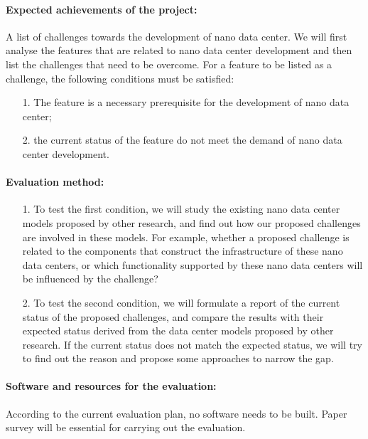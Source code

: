 \documentclass[sigchi-a, authorversion]{acmart}
\begin{document}
\paragraph{Expected achievements of the project:} A list of challenges towards the development of nano data center.
We will first analyse the features that are related to nano data center development and then list the challenges that need to be overcome. 
For a feature to be listed as a challenge, 
the following conditions must be satisfied:
\begin{enumerate}
\item[1.] The feature is a necessary prerequisite for the development of nano data center;
\item[2.] the current status of the feature do not meet the demand of nano data center development. 
\end{enumerate}

\paragraph{Evaluation method:} 
\begin{enumerate}
\item[1.] To test the first condition, 
we will study the existing nano data center models proposed by other research, 
and find out how our proposed challenges are involved in these models. 
For example, whether a proposed challenge is related to the components that construct the infrastructure of these nano data centers,
or which functionality supported by these nano data centers will be influenced by the challenge?
\item[2.] To test the second condition,
we will formulate a report of the current status of the proposed challenges,
and compare the results with their expected status derived from the data center models proposed by other research.
If the current status does not match the expected status,
we will try to find out the reason and propose some approaches to narrow the gap.
\end{enumerate}

\paragraph{Software and resources for the evaluation:}
According to the current evaluation plan, no software needs to be built. Paper survey will be essential for carrying out the evaluation.
\end{document}
